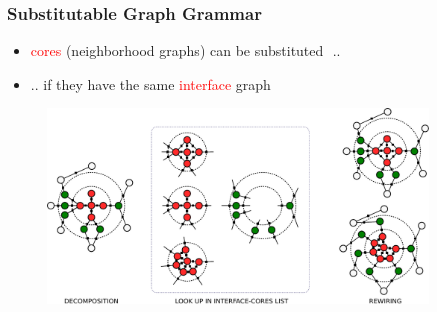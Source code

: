 \documentclass{beamer}
\newcommand{\red}[1]{\textcolor{red}{#1}}
\begin{document}

\begin{frame}
    \frametitle{Substitutable Graph Grammar}
    \begin{itemize}
        \item \red{cores} (neighborhood graphs) can be substituted  ..
        \item .. if they have the same \red{interface} graph
    \end{itemize}
    \begin{figure}[ht]
        \centering
        \includegraphics[width=0.9\textwidth]{images/cip2.pdf}
    \end{figure}
\end{frame}



\end{document}
